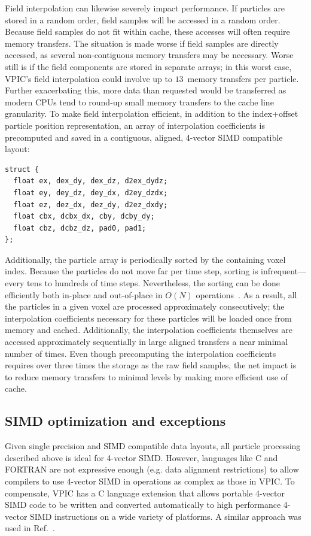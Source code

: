 \documentclass[journal,twoside]{IEEEtran}
\begin{document}
Field interpolation can likewise severely impact performance.  If
particles are stored in a random order, field samples will be accessed
in a random order.  Because field samples do not fit within cache,
these accesses will often require memory transfers.  The situation is
made worse if field samples are directly accessed, as several
non-contiguous memory transfers may be necessary.  Worse still is if
the field components are stored in separate arrays; in this worst
case, VPIC's field interpolation could involve up to $13$~memory
transfers per particle.  Further exacerbating this, more data than
requested would be transferred as modern CPUs tend to round-up small
memory transfers to the cache line granularity.  To make field
interpolation efficient, in addition to the index+offset particle
position representation, an array of interpolation coefficients is
precomputed and saved in a contiguous, aligned, 4-vector SIMD
compatible layout:
\begin{verbatim}
struct {
  float ex, dex_dy, dex_dz, d2ex_dydz;
  float ey, dey_dz, dey_dx, d2ey_dzdx;
  float ez, dez_dx, dez_dy, d2ez_dxdy;
  float cbx, dcbx_dx, cby, dcby_dy;
  float cbz, dcbz_dz, pad0, pad1;
};
\end{verbatim}

Additionally, the particle array is periodically sorted by the
containing voxel index.  Because the particles do not move far per
time step, sorting is infrequent---every tens to hundreds of time
steps.  Nevertheless, the sorting can be done efficiently both
in-place and out-of-place in $O(N)$ operations~\cite{Bowers_2001}.  As
a result, all the particles in a given voxel are processed
approximately consecutively; the interpolation coefficients necessary
for these particles will be loaded once from memory and cached.
Additionally, the interpolation coefficients themselves are accessed
approximately sequentially in large aligned transfers a near minimal
number of times.  Even though precomputing the interpolation
coefficients requires over three times the storage as the raw field
samples, the net impact is to reduce memory transfers to minimal
levels by making more efficient use of cache.

\subsection{SIMD optimization and exceptions}

Given single precision and SIMD compatible data layouts, all particle
processing described above is ideal for 4-vector SIMD.  However,
languages like C and FORTRAN are not expressive enough (e.g. data
alignment restrictions) to allow compilers to use 4-vector SIMD in
operations as complex as those in VPIC.  To compensate, VPIC has a C
language extension that allows portable 4-vector SIMD code to be
written and converted automatically to high performance 4-vector SIMD
instructions on a wide variety of platforms.  A similar approach was
used in Ref.~\cite{Bowers_et_al_2006}.
\end{document}
